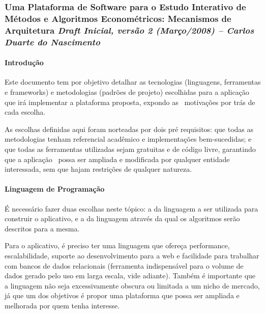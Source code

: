 \documentclass[12pt,twoside]{article}
\begin{document}
\subsubsection[Uma Plataforma de Software para o EstudoInterativo de
M\'etodos e Algoritmos Econom\'etricos:Mecanismos de ArquiteturaDraft
Inicial, vers\~ao 2 (Mar\c{c}o/2008) {--} Carlos Duarte do
Nascimento]{Uma Plataforma de Software para o Estudo\newline
Interativo de M\'etodos e Algoritmos Econom\'etricos:\newline
Mecanismos de Arquitetura\newline
\newline
\textmd{\textit{Draft Inicial, vers\~ao 2 (Mar\c{c}o/2008) {--} Carlos
Duarte do Nascimento}}}
\paragraph{Introdu\c{c}\~ao}
Este documento tem por objetivo detalhar as tecnologias (linguagens,
ferramentas e frameworks) e metodologias (padr\~oes de projeto)
escolhidas para a aplica\c{c}\~ao que ir\'a implementar a plataforma
proposta, expondo as \ motiva\c{c}\~oes por tr\'as de cada escolha.

As escolhas definidas aqui foram norteadas por dois pr\'e requisitos:
que todas as metodologias tenham referencial acad\^emico e
implementa\c{c}\~oes bem{}-sucedidas; e que todas as ferramentas
utilizadas sejam gratuitas e de c\'odigo livre, garantindo que a
aplica\c{c}\~ao \ possa ser ampliada e modificada por qualquer entidade
interessada, sem que hajam restri\c{c}\~oes de qualquer natureza.

\paragraph{Linguagem de Programa\c{c}\~ao}
\'E necess\'ario fazer duas escolhas neste t\'opico: a da linguagem a
ser utilizada para construir o aplicativo, e a da linguagem atrav\'es
da qual os algoritmos ser\~ao descritos para a mesma.

Para o aplicativo, \'e preciso ter uma linguagem que ofere\c{c}a
performance, escalabilidade, suporte ao desenvolvimento para a web e
facilidade para trabalhar com bancos de dados relacionais (ferramenta
indispens\'avel para o volume de dados gerado pelo uso em larga escala,
vide adiante). Tamb\'em \'e importante que a linguagem n\~ao seja
excessivamente obscura ou limitada a um nicho de mercado, j\'a que um
dos objetivos \'e propor uma plataforma que possa ser ampliada e
melhorada por quem tenha interesse.
\end{document}
